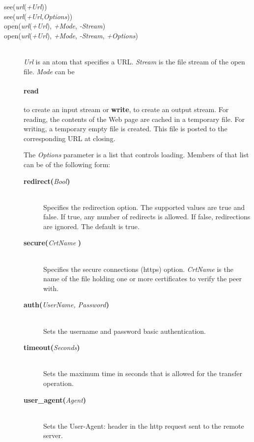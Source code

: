 \begin{description}

\item[see({\it url}({\it +Url}))]\mbox{}
\item[see({\it url}({\it +Url,Options}))]\mbox{}
\item[open({\it url}({\it +Url}), {\it +Mode}, {\it -Stream})]\mbox{}
\item[open({\it url}({\it +Url}), {\it +Mode}, {\it -Stream}, {\it +Options})]\mbox{}
  \\

{\it Url} is an atom that specifies a URL.
\emph{Stream} is the file stream of the open file.
{\it Mode} can be
\paragraph{read} to create an input stream or
{\bf write},  to create an output stream.
For reading, the contents of the Web page are cached in a temporary file.
For writing, a temporary empty file is created. This file is posted to the
corresponding URL at closing.

The {\it Options} parameter is a list that controls loading. Members of that list can be of the following form:

  \begin{description}
  \item[{\bf redirect}{\bf (}{\it Bool}{\bf )}]\mbox{}
    \\
    Specifies the redirection option. The supported values are true and
    false. If true, any number of redirects is allowed. If false,
    redirections are ignored.
    The default is true.

  \item[{\bf secure}{\bf (}{\it CrtName}{\bf
    )}]\mbox{}
    \\
    Specifies the secure connections (https) option. \emph{CrtName} is the name of the file holding one or more certificates to verify the peer with. 

  \item[{\bf auth}{\bf (}{\it UserName, \it Password}{\bf )}]\mbox{}\\Sets the username and password basic authentication.

  \item[{\bf timeout}{\bf (}{\it Seconds}{\bf )}]\mbox{}\\Sets the maximum time in seconds that is allowed for the transfer operation.

  \item[{\bf user\_agent}{\bf (}{\it Agent}{\bf )}]\mbox{}\\Sets the User-Agent: header in the http request sent to the remote server.

  \end{description}


\end{description}

